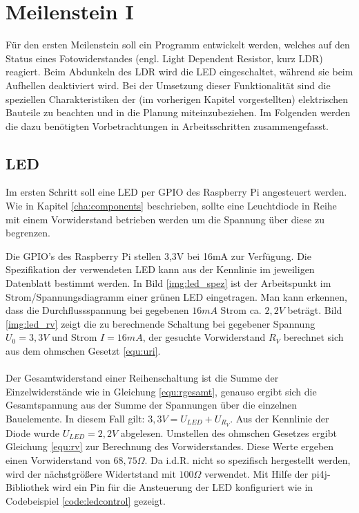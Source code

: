 \chapter{Meilenstein I}
\label{cha:ms1}

Für den ersten Meilenstein soll ein Programm entwickelt werden, welches auf den Status eines Fotowiderstandes (engl. Light Dependent Resistor, kurz LDR) reagiert. Beim Abdunkeln des LDR wird die LED eingeschaltet, während sie beim Aufhellen deaktiviert wird. Bei der Umsetzung dieser Funktionalität sind die speziellen Charakteristiken der (im vorherigen Kapitel vorgestellten) elektrischen Bauteile zu beachten und in die Planung miteinzubeziehen. Im Folgenden werden die dazu benötigten Vorbetrachtungen in Arbeitsschritten zusammengefasst. 


\section{LED}

Im ersten Schritt soll eine LED per GPIO des Raspberry Pi angesteuert werden. Wie in Kapitel \ref{cha:components} beschrieben, sollte eine Leuchtdiode in Reihe mit einem Vorwiderstand betrieben werden um die Spannung über diese zu begrenzen. 


Die GPIO's des Raspberry Pi stellen 3,3V bei 16mA zur Verfügung. Die Spezifikation der verwendeten LED kann aus der Kennlinie im jeweiligen Datenblatt bestimmt werden. In Bild \ref{img:led_spez} ist der Arbeitspunkt im Strom/Spannungsdiagramm einer grünen LED eingetragen. Man kann erkennen, dass die Durchflussspannung bei gegebenen $16mA$ Strom ca. $2,2V$ beträgt. Bild \ref{img:led_rv} zeigt die zu berechnende Schaltung bei gegebener Spannung $U_0 = 3,3V$ und Strom $I = 16mA$, der gesuchte Vorwiderstand $R_V$ berechnet sich aus dem ohmschen Gesetzt \ref{equ:uri}. \\
\\
Der Gesamtwiderstand einer Reihenschaltung ist die Summe der Einzelwiderstände wie in Gleichung \ref{equ:rgesamt}, genauso ergibt sich die Gesamtspannung aus der Summe der Spannungen über die einzelnen Bauelemente. In diesem Fall gilt: $3,3V = U_{LED} + U_{R_V}$. Aus der Kennlinie der Diode wurde $U_{LED} = 2,2V$ abgelesen. Umstellen des ohmschen Gesetzes ergibt Gleichung \ref{equ:rv} zur Berechnung des Vorwiderstandes. Diese Werte ergeben einen  Vorwiderstand von $68,75 \Omega$. Da i.d.R. nicht so spezifisch hergestellt werden, wird der nächstgrößere Widertstand mit $100 \Omega$ verwendet. Mit Hilfe der pi4j-Bibliothek wird ein Pin für die Ansteuerung der LED konfiguriert wie in Codebeispiel \ref{code:ledcontrol} gezeigt.


